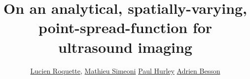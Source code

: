 

\title[EPFLIBM]{On an analytical, spatially-varying, point-spread-function for ultrasound imaging}

\author[short-author]{ %
	\href{mailto:lucien.roquette@epfl.ch}{Lucien Roquette},
	\href{mailto:mathieu.simeoni@epfl.ch}{Mathieu Simeoni}
	\href{mailto:mathieu.simeoni@epfl.ch}{Paul Hurley}
	\href{mailto:adrien.besson@epfl.ch}{Adrien Besson}	
}

